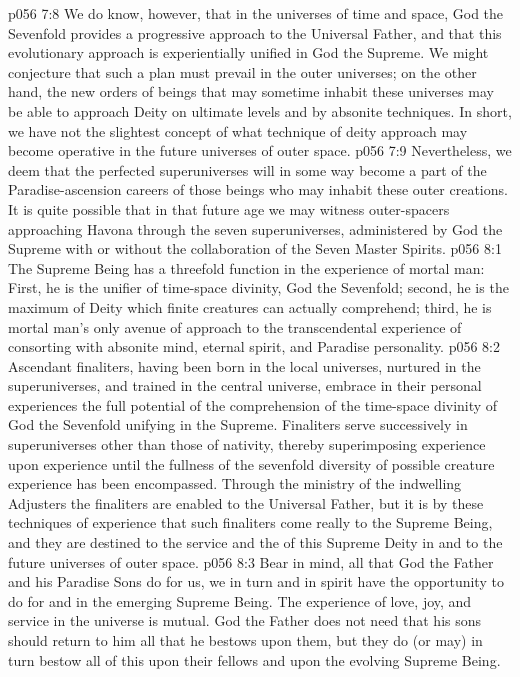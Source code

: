 \vs p056 7:8 We do know, however, that in the universes of time and space, God the Sevenfold provides a progressive approach to the Universal Father, and that this evolutionary approach is experientially unified in God the Supreme. We might conjecture that such a plan must prevail in the outer universes; on the other hand, the new orders of beings that may sometime inhabit these universes may be able to approach Deity on ultimate levels and by absonite techniques. In short, we have not the slightest concept of what technique of deity approach may become operative in the future universes of outer space.
\vs p056 7:9 Nevertheless, we deem that the perfected superuniverses will in some way become a part of the Paradise\hyp{}ascension careers of those beings who may inhabit these outer creations. It is quite possible that in that future age we may witness outer\hyp{}spacers approaching Havona through the seven superuniverses, administered by God the Supreme with or without the collaboration of the Seven Master Spirits.\plusone
{}
\vs p056 8:1 The Supreme Being has a threefold function in the experience of mortal man: First, he is the unifier of time\hyp{}space divinity, God the Sevenfold; second, he is the maximum of Deity which finite creatures can actually comprehend; third, he is mortal man’s only avenue of approach to the transcendental experience of consorting with absonite mind, eternal spirit, and Paradise personality.
\vs p056 8:2 Ascendant finaliters, having been born in the local universes, nurtured in the superuniverses, and trained in the central universe, embrace in their personal experiences the full potential of the comprehension of the time\hyp{}space divinity of God the Sevenfold unifying in the Supreme. Finaliters serve successively in superuniverses other than those of nativity, thereby superimposing experience upon experience until the fullness of the sevenfold diversity of possible creature experience has been encompassed. Through the ministry of the indwelling Adjusters the finaliters are enabled to  the Universal Father, but it is by these techniques of experience that such finaliters come really to  the Supreme Being, and they are destined to the service and the  of this Supreme Deity in and to the future universes of outer space.
\vs p056 8:3 Bear in mind, all that God the Father and his Paradise Sons do for us, we in turn and in spirit have the opportunity to do for and in the emerging Supreme Being. The experience of love, joy, and service in the universe is mutual. God the Father does not need that his sons should return to him all that he bestows upon them, but they do (or may) in turn bestow all of this upon their fellows and upon the evolving Supreme Being.
